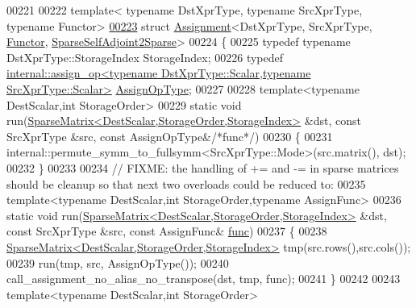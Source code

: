\begin{DoxyCode}
00221 
00222 \textcolor{keyword}{template}< \textcolor{keyword}{typename} DstXprType, \textcolor{keyword}{typename} SrcXprType, \textcolor{keyword}{typename} Functor>
\hyperlink{struct_eigen_1_1internal_1_1_assignment_3_01_dst_xpr_type_00_01_src_xpr_type_00_01_functor_00_017b35cf78061a31c93b838bddfa619fa3}{00223} \textcolor{keyword}{struct }\hyperlink{struct_eigen_1_1internal_1_1_assignment}{Assignment}<DstXprType, SrcXprType, \hyperlink{struct_functor}{Functor}, 
      \hyperlink{struct_eigen_1_1internal_1_1_sparse_self_adjoint2_sparse}{SparseSelfAdjoint2Sparse}>
00224 \{
00225   \textcolor{keyword}{typedef} \textcolor{keyword}{typename} DstXprType::StorageIndex StorageIndex;
00226   \textcolor{keyword}{typedef} 
      \hyperlink{struct_eigen_1_1internal_1_1assign__op}{internal::assign\_op<typename DstXprType::Scalar,typename SrcXprType::Scalar>}
       \hyperlink{struct_eigen_1_1internal_1_1assign__op}{AssignOpType};
00227 
00228   \textcolor{keyword}{template}<\textcolor{keyword}{typename} DestScalar,\textcolor{keywordtype}{int} StorageOrder>
00229   \textcolor{keyword}{static} \textcolor{keywordtype}{void} run(\hyperlink{group___sparse_core___module_class_eigen_1_1_sparse_matrix}{SparseMatrix<DestScalar,StorageOrder,StorageIndex>}
       &dst, \textcolor{keyword}{const} SrcXprType &src, \textcolor{keyword}{const} AssignOpType&\textcolor{comment}{/*func*/})
00230   \{
00231     internal::permute\_symm\_to\_fullsymm<SrcXprType::Mode>(src.matrix(), dst);
00232   \}
00233 
00234   \textcolor{comment}{// FIXME: the handling of += and -= in sparse matrices should be cleanup so that next two overloads could
       be reduced to:}
00235   \textcolor{keyword}{template}<\textcolor{keyword}{typename} DestScalar,\textcolor{keywordtype}{int} StorageOrder,\textcolor{keyword}{typename} AssignFunc>
00236   \textcolor{keyword}{static} \textcolor{keywordtype}{void} run(\hyperlink{group___sparse_core___module_class_eigen_1_1_sparse_matrix}{SparseMatrix<DestScalar,StorageOrder,StorageIndex>}
       &dst, \textcolor{keyword}{const} SrcXprType &src, \textcolor{keyword}{const} AssignFunc& \hyperlink{structfunc}{func})
00237   \{
00238     \hyperlink{group___sparse_core___module_class_eigen_1_1_sparse_matrix}{SparseMatrix<DestScalar,StorageOrder,StorageIndex>} 
      tmp(src.rows(),src.cols());
00239     run(tmp, src, AssignOpType());
00240     call\_assignment\_no\_alias\_no\_transpose(dst, tmp, func);
00241   \}
00242 
00243   \textcolor{keyword}{template}<\textcolor{keyword}{typename} DestScalar,\textcolor{keywordtype}{int} StorageOrder>

\end{DoxyCode}
